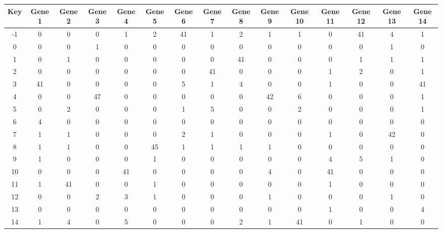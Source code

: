 \begin{tabular}{|c|c|c|c|c|c|c|c|c|c|c|c|c|c|c|}
\hline
Key & Gene 1 & Gene 2 & Gene 3 & Gene 4 & Gene 5 & Gene 6 & Gene 7 & Gene 8 & Gene 9 & Gene 10 & Gene 11 & Gene 12 & Gene 13 & Gene 14 \\
\hline
-1 & 0 & 0 & 0 & 1 & 2 & 41 & 1 & 2 & 1 & 1 & 0 & 41 & 4 & 1 \\
0 & 0 & 0 & 1 & 0 & 0 & 0 & 0 & 0 & 0 & 0 & 0 & 0 & 1 & 0 \\
1 & 0 & 1 & 0 & 0 & 0 & 0 & 0 & 41 & 0 & 0 & 0 & 1 & 1 & 1 \\
2 & 0 & 0 & 0 & 0 & 0 & 0 & 41 & 0 & 0 & 0 & 1 & 2 & 0 & 1 \\
3 & 41 & 0 & 0 & 0 & 0 & 5 & 1 & 4 & 0 & 0 & 1 & 0 & 0 & 41 \\
4 & 0 & 0 & 47 & 0 & 0 & 0 & 0 & 0 & 42 & 6 & 0 & 0 & 0 & 1 \\
5 & 0 & 2 & 0 & 0 & 0 & 1 & 5 & 0 & 0 & 2 & 0 & 0 & 0 & 1 \\
6 & 4 & 0 & 0 & 0 & 0 & 0 & 0 & 0 & 0 & 0 & 0 & 0 & 0 & 0 \\
7 & 1 & 1 & 0 & 0 & 0 & 2 & 1 & 0 & 0 & 0 & 1 & 0 & 42 & 0 \\
8 & 1 & 1 & 0 & 0 & 45 & 1 & 1 & 1 & 1 & 0 & 0 & 0 & 0 & 0 \\
9 & 1 & 0 & 0 & 0 & 1 & 0 & 0 & 0 & 0 & 0 & 4 & 5 & 1 & 0 \\
10 & 0 & 0 & 0 & 41 & 0 & 0 & 0 & 0 & 4 & 0 & 41 & 0 & 0 & 0 \\
11 & 1 & 41 & 0 & 0 & 1 & 0 & 0 & 0 & 0 & 0 & 1 & 0 & 0 & 0 \\
12 & 0 & 0 & 2 & 3 & 1 & 0 & 0 & 0 & 1 & 0 & 0 & 0 & 1 & 0 \\
13 & 0 & 0 & 0 & 0 & 0 & 0 & 0 & 0 & 0 & 0 & 1 & 0 & 0 & 4 \\
14 & 1 & 4 & 0 & 5 & 0 & 0 & 0 & 2 & 1 & 41 & 0 & 1 & 0 & 0 \\
\hline
\end{tabular}